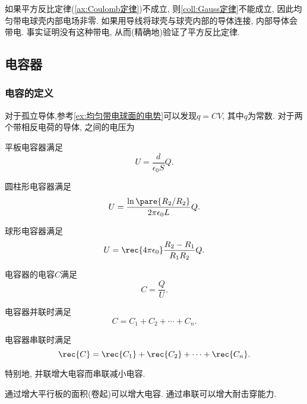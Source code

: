 \documentclass[../Electromagnetism.tex]{subfiles}
\begin{document}
\begin{ex}
	如果平方反比定律(\cref{ax:Coulomb定律})不成立, 则\cref{coll:Gauss定律}不能成立, 因此均匀带电球壳内部电场非零. 如果用导线将球壳与球壳内部的导体连接, 内部导体会带电. 事实证明没有这种带电, 从而(精确地)验证了平方反比定律.
\end{ex}



\subsection{电容器} %
\label{sub:电容器}

\subsubsection{电容的定义} %
\label{ssub:电容的定义}

对于孤立导体,参考\cref{ex:均匀带电球面的电势}可以发现$q=CV$, 其中$q$为常数. 对于两个带相反电荷的导体, 之间的电压为
\begin{finale}
	\begin{corollary}[特殊电容器]\quad
		\begin{cenum}
			\item 平板电容器满足
			\begin{equation}
				\label{eq:平行板电容器电容}
				U = \frac{d}{\epsilon_0 S}Q.
			\end{equation}
			\item 圆柱形电容器满足
			\[ U = \frac{\ln\pare{R_2/R_2}}{2\pi\epsilon_0 L}Q. \]
			\item 球形电容器满足
			\[ U = \rec{4\pi\epsilon_0}\frac{R_2 - R_1}{R_1 R_2}Q. \]
		\end{cenum}
	\end{corollary}
\end{finale}
\begin{definition}[电容]
	电容器的电容$C$满足
	\[ C = \frac{Q}{U}. \]
\end{definition}
\begin{finale}
	\begin{corollary}[电容器的并联与串联]\quad
		\begin{cenum}
			\item 电容器并联时满足
			\[ C = C_1 + C_2 + \cdots + C_n. \]
			\item 电容器串联时满足
			\[ \rec{C} = \rec{C_1} + \rec{C_2} + \cdots + \rec{C_n}. \]
		\end{cenum}
		特别地, 并联增大电容而串联减小电容.
	\end{corollary}
\end{finale}
\begin{ex}
	通过增大平行板的面积(卷起)可以增大电容. 通过串联可以增大耐击穿能力.
\end{ex}
\end{document}

